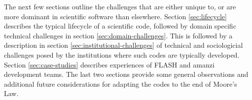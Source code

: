 The next few sections outline the challenges that  
are either unique to, or are more dominant in scientific
software than elsewhere. Section \ref{sec:lifecycle} describes the
typical lifecycle of a scientific code, followed by domain specific
technical challenges in section \ref{sec:domain-challenges}. This is
followed by a description in section \ref{sec:institutional-challenges}
of technical and sociologicial challenges posed by the institutions
where such codes are typically developed. Section
\ref{sec:case-studies} describes experiences of FLASH and amanzi
development teams. The last two sections provide some general
observations and additional future considerations for adapting the
codes to the end of Moore's Law.


